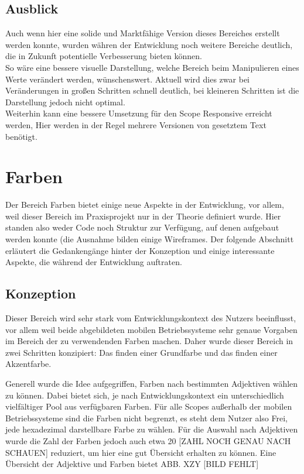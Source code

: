 \subsection{Ausblick}
Auch wenn hier eine solide und Marktfähige Version dieses Bereiches erstellt werden konnte, wurden währen der Entwicklung noch weitere Bereiche deutlich, die in Zukunft potentielle Verbesserung bieten können.\\
So wäre eine bessere visuelle Darstellung, welche Bereich beim Manipulieren eines Werte verändert werden, wünschenswert. Aktuell wird dies zwar bei Veränderungen in großen Schritten schnell deutlich, bei kleineren Schritten ist die Darstellung jedoch nicht optimal.\\
Weiterhin kann eine bessere Umsetzung für den Scope Responsive erreicht werden, Hier werden in der Regel mehrere Versionen von gesetztem Text benötigt.


\section{Farben}
Der Bereich Farben bietet einige neue Aspekte in der Entwicklung, vor allem, weil dieser Bereich im Praxisprojekt nur in der Theorie definiert wurde. Hier standen also weder Code noch Struktur zur Verfügung, auf denen aufgebaut werden konnte (die Ausnahme bilden einige Wireframes. Der folgende Abschnitt erläutert die Gedankengänge hinter der Konzeption und einige interessante Aspekte, die während der Entwicklung auftraten.

\subsection{Konzeption}
Dieser Bereich wird sehr stark vom Entwicklungskontext des Nutzers beeinflusst, vor allem weil beide abgebildeten mobilen Betriebssysteme sehr genaue Vorgaben im Bereich der zu verwendenden Farben machen.
Daher wurde dieser Bereich in zwei Schritten konzipiert: Das finden einer Grundfarbe und das finden einer Akzentfarbe.

Generell wurde die Idee aufgegriffen, Farben nach bestimmten Adjektiven wählen zu können. Dabei bietet sich, je nach Entwicklungskontext ein unterschiedlich vielfältiger Pool aus verfügbaren Farben.
Für alle Scopes außerhalb der mobilen Betriebssysteme sind die Farben nicht begrenzt, es steht dem Nutzer also Frei, jede hexadezimal darstellbare Farbe zu wählen. Für die Auswahl nach Adjektiven wurde die Zahl der Farben jedoch auch etwa 20 [ZAHL NOCH GENAU NACH SCHAUEN] reduziert, um hier eine gut Übersicht erhalten zu können. Eine Übersicht der Adjektive und Farben bietet ABB. XZY [BILD FEHLT]


